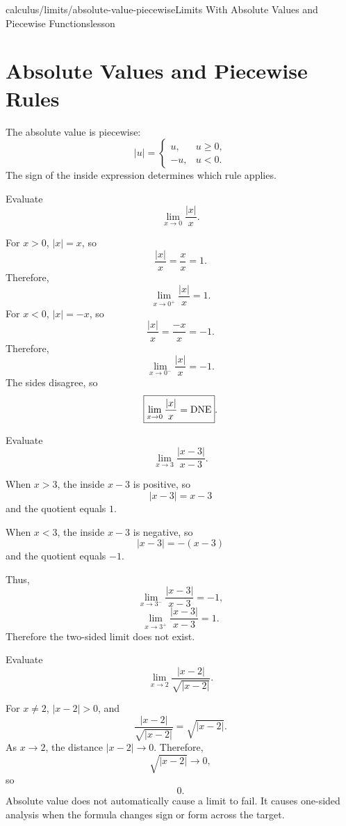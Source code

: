 \begin{webpage}{calculus/limits/absolute-value-piecewise}{Limits With Absolute Values and Piecewise Functions}{lesson}
\section{Absolute Values and Piecewise Rules}


The absolute value is piecewise:
\[
  |u|=
  \begin{cases}
    u,&u\ge0,\\
    -u,&u<0.
  \end{cases}
\]
The sign of the inside expression determines which rule applies.

\begin{bgguided}[title={\(|x|/x\)}]
Evaluate
\[
  \lim_{x\to0}\frac{|x|}{x}.
\]

\begin{bgsolution}
For \(x>0\), \(|x|=x\), so
\[
  \frac{|x|}{x}=\frac{x}{x}=1.
\]
Therefore,
\[
  \lim_{x\to0^+}\frac{|x|}{x}=1.
\]
For \(x<0\), \(|x|=-x\), so
\[
  \frac{|x|}{x}=\frac{-x}{x}=-1.
\]
Therefore,
\[
  \lim_{x\to0^-}\frac{|x|}{x}=-1.
\]
The sides disagree, so
\[
  \boxed{\lim_{x\to0}\frac{|x|}{x}=\mathrm{DNE}}.
\]
\end{bgsolution}
\end{bgguided}

\begin{bgexample}[title={A shifted absolute value}]
Evaluate
\[
  \lim_{x\to3}\frac{|x-3|}{x-3}.
\]

\begin{bgsolution}
When \(x>3\), the inside \(x-3\) is positive, so
\[
  |x-3|=x-3
\]
and the quotient equals \(1\).

When \(x<3\), the inside \(x-3\) is negative, so
\[
  |x-3|=-(x-3)
\]
and the quotient equals \(-1\).

Thus,
\[
  \lim_{x\to3^-}\frac{|x-3|}{x-3}=-1,
\]
\[
  \lim_{x\to3^+}\frac{|x-3|}{x-3}=1.
\]
Therefore the two-sided limit does not exist.
\end{bgsolution}
\end{bgexample}

\begin{bgexample}[title={An absolute value whose limit does exist}]
Evaluate
\[
  \lim_{x\to2}\frac{|x-2|}{\sqrt{|x-2|}}.
\]

\begin{bgsolution}
For \(x\ne2\), \(|x-2|>0\), and
\[
  \frac{|x-2|}{\sqrt{|x-2|}}=\sqrt{|x-2|}.
\]
As \(x\to2\), the distance \(|x-2|\to0\). Therefore,
\[
  \sqrt{|x-2|}\to0,
\]
so
\[
  \boxed{0}.
\]
Absolute value does not automatically cause a limit to fail. It causes one-sided analysis when the formula changes sign or form across the target.
\end{bgsolution}
\end{bgexample}
\end{webpage}

